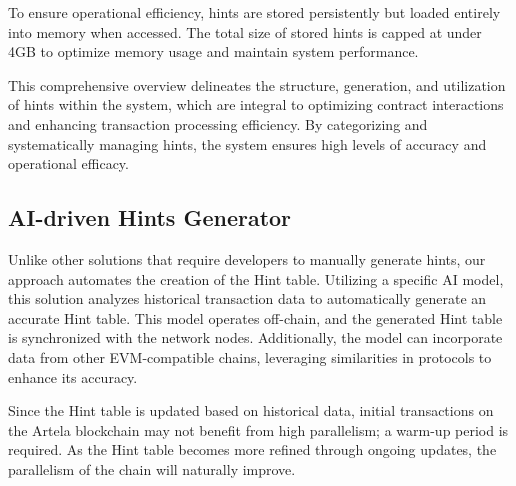 To ensure operational efficiency, hints are stored persistently but loaded entirely into memory when accessed. The total size of stored hints is capped at under 4GB to optimize memory usage and maintain system performance.

This comprehensive overview delineates the structure, generation, and utilization of hints within the system, which are integral to optimizing contract interactions and enhancing transaction processing efficiency. By categorizing and systematically managing hints, the system ensures high levels of accuracy and operational efficacy.

\subsection{AI-driven Hints Generator}

Unlike other solutions that require developers to manually generate hints, our approach automates the creation of the Hint table. Utilizing a specific AI model, this solution analyzes historical transaction data to automatically generate an accurate Hint table. This model operates off-chain, and the generated Hint table is synchronized with the network nodes. Additionally, the model can incorporate data from other EVM-compatible chains, leveraging similarities in protocols to enhance its accuracy.

Since the Hint table is updated based on historical data, initial transactions on the Artela blockchain may not benefit from high parallelism; a warm-up period is required. As the Hint table becomes more refined through ongoing updates, the parallelism of the chain will naturally improve.